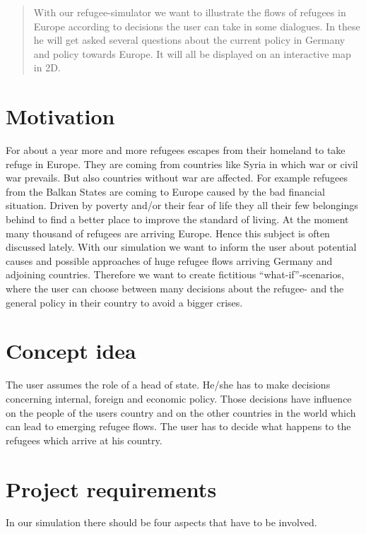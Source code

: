 \documentclass{acm_proc_article-sp}
\begin{document}
\begin{abstract}
With our refugee-simulator we want to illustrate the flows of refugees in Europe according to decisions the user can take in some dialogues. In these he will get asked several questions about the current policy in Germany and policy towards Europe. It will all be displayed on an interactive map in 2D.

\end{abstract}

\section{Motivation}
For about a year more and more refugees escapes from their homeland to take refuge in Europe. They are coming from countries like Syria in which war or civil war prevails. But also countries without war are affected. For example refugees from the Balkan States are coming to Europe caused by the bad financial situation. Driven by poverty and/or their fear of life they all their few belongings behind to find a better place to improve the standard of living. At the moment many thousand of refugees are arriving Europe. Hence this subject is often discussed lately. With our simulation we want to inform the user about potential causes and possible approaches of huge refugee flows arriving Germany and adjoining countries. Therefore we want to create fictitious ``what-if''-scenarios, where the user can choose between many decisions about the refugee- and the general policy in their country to avoid a bigger crises.


%

\section{Concept idea}
\label{concept idea}
The user assumes the role of a head of state. He/she has to make decisions concerning internal, foreign and economic policy. Those decisions have influence on the people of the users country  and on the other countries in the world which can lead to emerging refugee flows. The user has to decide what happens to the refugees which arrive at his country. 

\section{Project requirements}
In our simulation there should be four aspects that have to be involved.
\end{document}
